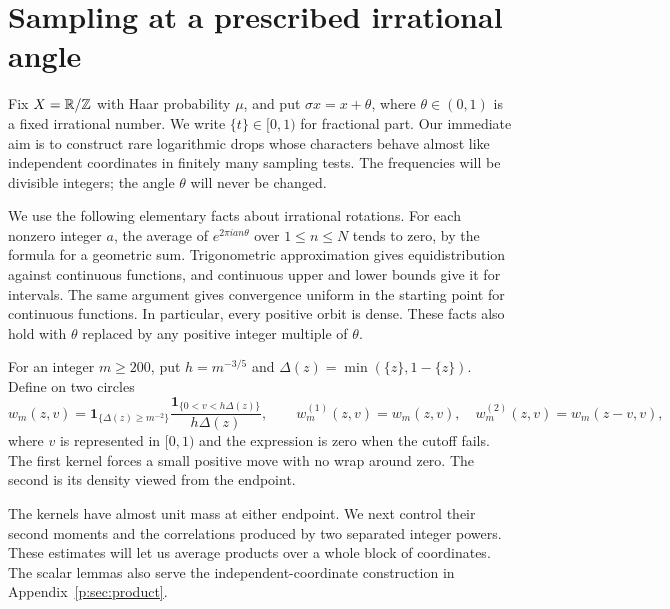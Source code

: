\section{Sampling at a prescribed irrational angle}\label{sec:parameters}

Fix $X=\mathbb R/\mathbb Z$ with Haar probability $\mu$, and put
$\sigma x=x+\theta$, where $\theta\in(0,1)$ is a fixed irrational number.
We write $\{t\}\in[0,1)$ for fractional part.  Our immediate aim is to
construct rare logarithmic drops whose characters behave almost like
independent coordinates in finitely many sampling tests.  The frequencies
will be divisible integers; the angle $\theta$ will never be changed.

We use the following elementary facts about irrational rotations.
For each nonzero integer $a$, the average of $e^{2\pi ian\theta}$ over
$1\le n\le N$ tends to zero, by the formula for a geometric sum.
Trigonometric approximation gives equidistribution against continuous
functions, and continuous upper and lower bounds give it for intervals.
The same argument gives convergence uniform in the starting point for
continuous functions.  In particular, every positive orbit is dense.
These facts also hold with $\theta$ replaced by any positive integer
multiple of $\theta$.

For an integer $m\ge200$, put $h=m^{-3/5}$ and
$\Delta(z)=\min(\{z\},1-\{z\})$.  Define on two circles
\begin{equation}\label{eq:sampling-kernel}
 w_m(z,v)=\mathbf1_{\{\Delta(z)\ge m^{-2}\}}
       \frac{\mathbf1_{\{0<v<h\Delta(z)\}}}{h\Delta(z)},
 \qquad
 w_m^{(1)}(z,v)=w_m(z,v),\quad
 w_m^{(2)}(z,v)=w_m(z-v,v),
\end{equation}
where $v$ is represented in $[0,1)$ and the expression is zero when the
cutoff fails.  The first kernel forces a small positive move with no
wrap around zero.  The second is its density viewed from the endpoint.

The kernels have almost unit mass at either endpoint.  We next control
their second moments and the correlations produced by two separated
integer powers.  These estimates will let us average products over a
whole block of coordinates.  The scalar lemmas also serve the
independent-coordinate construction in Appendix~\ref{p:sec:product}.

